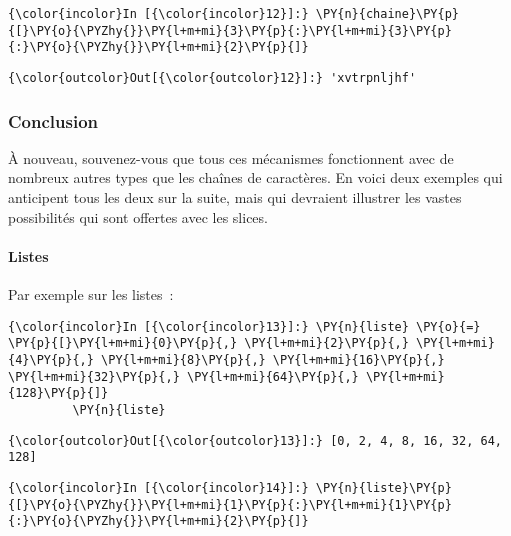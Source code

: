     \begin{Verbatim}[commandchars=\\\{\}]
{\color{incolor}In [{\color{incolor}12}]:} \PY{n}{chaine}\PY{p}{[}\PY{o}{\PYZhy{}}\PY{l+m+mi}{3}\PY{p}{:}\PY{l+m+mi}{3}\PY{p}{:}\PY{o}{\PYZhy{}}\PY{l+m+mi}{2}\PY{p}{]}
\end{Verbatim}


\begin{Verbatim}[commandchars=\\\{\}]
{\color{outcolor}Out[{\color{outcolor}12}]:} 'xvtrpnljhf'
\end{Verbatim}
            
    \hypertarget{conclusion}{%
\subsubsection{Conclusion}\label{conclusion}}

    À nouveau, souvenez-vous que tous ces mécanismes fonctionnent avec de
nombreux autres types que les chaînes de caractères. En voici deux
exemples qui anticipent tous les deux sur la suite, mais qui devraient
illustrer les vastes possibilités qui sont offertes avec les slices.

    \hypertarget{listes}{%
\paragraph{Listes}\label{listes}}

    Par exemple sur les listes~:

    \begin{Verbatim}[commandchars=\\\{\}]
{\color{incolor}In [{\color{incolor}13}]:} \PY{n}{liste} \PY{o}{=} \PY{p}{[}\PY{l+m+mi}{0}\PY{p}{,} \PY{l+m+mi}{2}\PY{p}{,} \PY{l+m+mi}{4}\PY{p}{,} \PY{l+m+mi}{8}\PY{p}{,} \PY{l+m+mi}{16}\PY{p}{,} \PY{l+m+mi}{32}\PY{p}{,} \PY{l+m+mi}{64}\PY{p}{,} \PY{l+m+mi}{128}\PY{p}{]}
         \PY{n}{liste}
\end{Verbatim}


\begin{Verbatim}[commandchars=\\\{\}]
{\color{outcolor}Out[{\color{outcolor}13}]:} [0, 2, 4, 8, 16, 32, 64, 128]
\end{Verbatim}
            
    \begin{Verbatim}[commandchars=\\\{\}]
{\color{incolor}In [{\color{incolor}14}]:} \PY{n}{liste}\PY{p}{[}\PY{o}{\PYZhy{}}\PY{l+m+mi}{1}\PY{p}{:}\PY{l+m+mi}{1}\PY{p}{:}\PY{o}{\PYZhy{}}\PY{l+m+mi}{2}\PY{p}{]}
\end{Verbatim}


